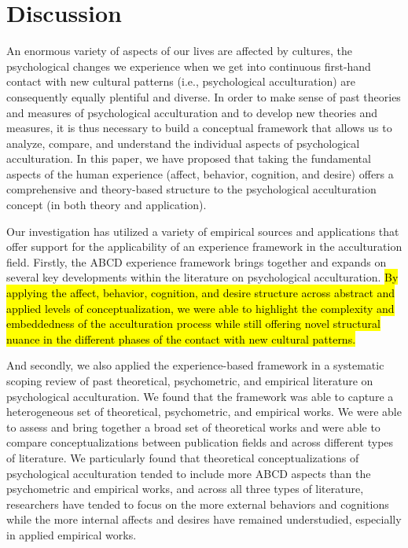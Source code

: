 \documentclass[man, 12pt, a4paper, mask]{apa7}
\begin{document}
\section{Discussion}
An enormous variety of aspects of our lives are affected by cultures, the psychological changes we experience when we get into continuous first-hand contact with new cultural patterns (i.e., psychological acculturation) are consequently equally plentiful and diverse.
In order to make sense of past theories and measures of psychological acculturation and to develop new theories and measures, it is thus necessary to build a conceptual framework that allows us to analyze, compare, and understand the individual aspects of psychological acculturation.
In this paper, we have proposed that taking the fundamental aspects of the human experience (affect, behavior, cognition, and desire) offers a comprehensive and theory-based structure to the psychological acculturation concept (in both theory and application). 

Our investigation has utilized a variety of empirical sources and applications that offer support for the applicability of an experience framework in the acculturation field. Firstly, the ABCD experience framework brings together and expands on several key developments within the literature on psychological acculturation. \hl{By applying the affect, behavior, cognition, and desire structure across abstract and applied levels of conceptualization, we were able to highlight the complexity and embeddedness of the acculturation process while still offering novel structural nuance in the different phases of the contact with new cultural patterns.}

And secondly, we also applied the experience-based framework in a systematic scoping review of past theoretical, psychometric, and empirical literature on psychological acculturation.
We found that the framework was able to capture a heterogeneous set of theoretical, psychometric, and empirical works. We were able to assess and bring together a broad set of theoretical works and were able to compare conceptualizations between publication fields and across different types of literature. We particularly found that theoretical conceptualizations of psychological acculturation tended to include more ABCD aspects than the psychometric and empirical works, and across all three types of literature, researchers have tended to focus on the more external behaviors and cognitions while the more internal affects and desires have remained understudied, especially in applied empirical works.
    
\end{document}
